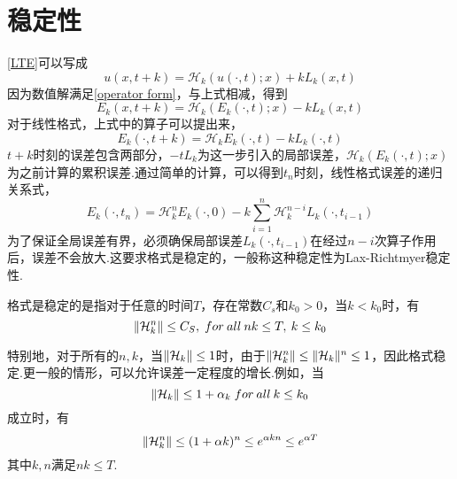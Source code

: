 \section{稳定性}
\eqref{LTE}可以写成
\begin{equation}
	u(x,t+k)=\mathcal{H}_k(u(\cdot,t);x)+kL_k(x,t)
\end{equation}
因为数值解满足\eqref{operator form}，与上式相减，得到
\begin{equation}
	E_k(x,t+k) = \mathcal{H}_k(E_k(\cdot,t);x) -kL_k(x,t)
\end{equation}
对于线性格式，上式中的算子可以提出来，
\begin{equation}
	E_k(\cdot,t+k) = \mathcal{H}_k E_k(\cdot,t) -kL_k(\cdot,t)	
\end{equation}
$t+k$时刻的误差包含两部分，$-tL_k$为这一步引入的局部误差，$\mathcal{H}_k(E_k(\cdot,t);x)$为之前计算的累积误差.通过简单的计算，可以得到$t_n$时刻，线性格式误差的递归关系式，
\begin{equation} \label{recursive relation}
	E_k(\cdot,t_n) = \mathcal{H}_k^n E_k(\cdot,0) - k\sum_{i=1}^n \mathcal{H}_k^{n-i} L_k(\cdot,t_{i-1})
\end{equation}
为了保证全局误差有界，必须确保局部误差$L_k(\cdot,t_{i-1})$在经过$n-i$次算子作用后，误差不会放大.这要求格式是稳定的，一般称这种稳定性为Lax-Richtmyer稳定性.
\begin{mydef}
	格式是稳定的是指对于任意的时间$T$，存在常数$C_s$和$k_0>0$，当$k<k_0$时，有
	\begin{equation}
		\lVert\mathcal{H}_k^n\rVert \le C_S,\;for\:all \: nk\le T,\: k \le k_0
	\end{equation}
\end{mydef}
特别地，对于所有的$n,k$，当$\lVert\mathcal{H}_k\rVert \le 1$时，由于$\lVert\mathcal{H}_k^n\rVert \le \lVert\mathcal{H}_k\rVert^n \le 1$，因此格式稳定.更一般的情形，可以允许误差一定程度的增长.例如，当
\begin{equation}
	\lVert\mathcal{H}_k\rVert \le 1+\alpha_k \; for \: all \: k\le k_0
\end{equation}
成立时，有
\begin{equation}
	\lVert\mathcal{H}_k^n\rVert \le (1+\alpha k)^n \le e^{\alpha kn} \le e^{\alpha T}
\end{equation}	
其中$k,n$满足$nk \le T$.

